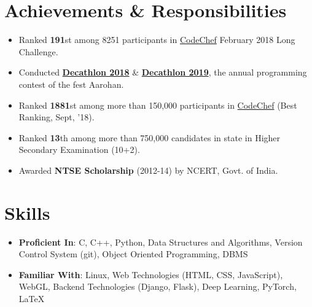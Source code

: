 \documentclass[a4paper,11pt]{article}
\newcommand{\resumeSubHeadingListStart}{\begin{itemize}[leftmargin=*, topsep=0pt]}
\newcommand{\resumeSubHeadingListEnd}{\end{itemize}}
\newcommand{\resumeItemListStart}{\begin{itemize}}
\newcommand{\resumeItemListEnd}{\end{itemize}\vspace{-5pt}}
\begin{document}
\section{Achievements \& Responsibilities}
    \resumeItemListStart
     \setlength{\itemsep}{0.5pt}
      \item
        {Ranked \textbf{191}st among 8251 participants in \href{https://www.codechef.com/rankings/FEB18?filterBy=Institution\%3DNational\%20Institute\%20of\%20Technology\%2C\%20Durgapur&order=asc&sortBy=rank}{CodeChef} February 2018 Long Challenge.}
      \item
        {Conducted \href{https://www.hackerrank.com/dec18}{\textbf{Decathlon 2018}} \& \href{https://www.hackerrank.com/decathlon19}{\textbf{Decathlon 2019}}, the annual programming contest of the fest Aarohan.}
      \item
        {Ranked \textbf{1881}st among more than 150,000 participants in \href{https://codechef.com/users/ayan_nitd}{CodeChef} (Best Ranking, Sept, '18).}
      \item
        {Ranked \textbf{13}th among more than 750,000 candidates in state in Higher Secondary Examination
        (10+2).}
      \item
        {Awarded \textbf{NTSE Scholarship} (2012-14) by NCERT, Govt. of India.}
    \resumeItemListEnd

\section{Skills}
 \resumeSubHeadingListStart
    \setlength{\itemsep}{1pt}
     \item\textbf{Proficient In}{: C, C++, Python, Data Structures and Algorithms, Version Control System (git), Object Oriented Programming, DBMS}\\
     \item\textbf{Familiar With}{: Linux, Web Technologies (HTML, CSS, JavaScript), WebGL, Backend Technologies (Django, Flask), Deep Learning, PyTorch, \LaTeX}
 \resumeSubHeadingListEnd
 
\end{document}
